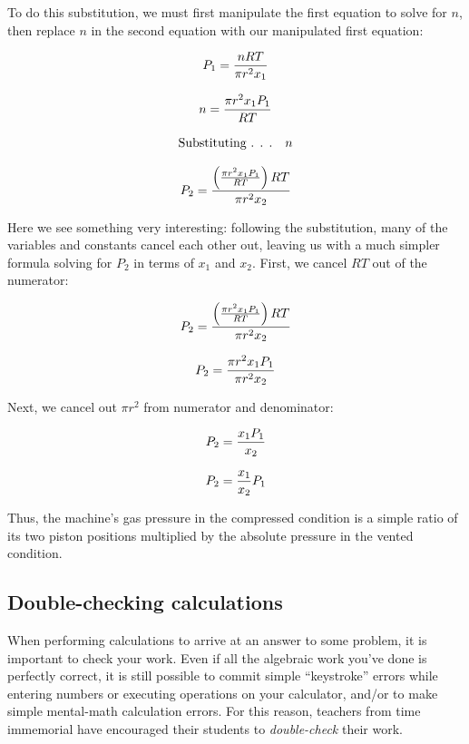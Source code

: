 \filbreak

To do this substitution, we must first manipulate the first equation to solve for $n$, then replace $n$ in the second equation with our manipulated first equation:

$$P_1 = {nRT \over \pi r^2 x_1}$$

$$n = {\pi r^2 x_1 P_1 \over RT}$$

$$\hbox{Substituting . . .} \hskip 10pt n$$

$$P_2 = {\left({\pi r^2 x_1 P_1 \over RT}\right) RT \over \pi r^2 x_2}$$

Here we see something very interesting: following the substitution, many of the variables and constants cancel each other out, leaving us with a much simpler formula solving for $P_2$ in terms of $x_1$ and $x_2$.  First, we cancel $RT$ out of the numerator:

$$P_2 = {\left({\pi r^2 x_1 P_1 \over RT}\right) RT \over \pi r^2 x_2}$$

$$P_2 = {\pi r^2 x_1 P_1  \over \pi r^2 x_2}$$

Next, we cancel out $\pi r^2$ from numerator and denominator:

$$P_2 = {x_1 P_1  \over x_2}$$

$$P_2 = {x_1 \over x_2} P_1$$

Thus, the machine's gas pressure in the compressed condition is a simple ratio of its two piston positions multiplied by the absolute pressure in the vented condition.







\filbreak
\subsection{Double-checking calculations}

When performing calculations to arrive at an answer to some problem, it is important to check your work.  Even if all the algebraic work you've done is perfectly correct, it is still possible to commit simple ``keystroke'' errors while entering numbers or executing operations on your calculator, and/or to make simple mental-math calculation errors.  For this reason, teachers from time immemorial have encouraged their students to \textit{double-check} their work.

